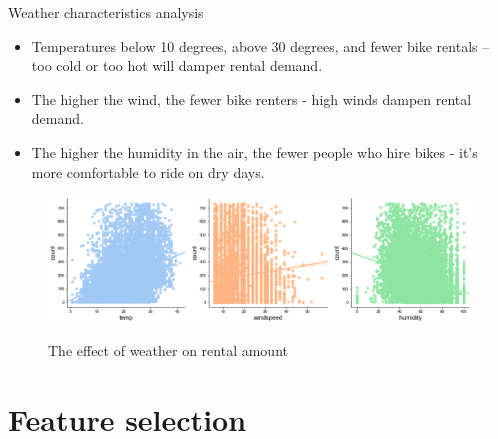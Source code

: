 \documentclass[
 size=14pt,
 paper=smartboard,  %
 mode=present, 		%
 display=slides, 	%
 style=tuliplab,  	%
 pauseslide,
 fleqn,leqno]{powerdot}
\begin{document}
\begin{slide}{Weather characteristics analysis}
  \begin{itemize}
    \item
    Temperatures below 10 degrees, above 30 degrees, and fewer bike rentals -- too cold or too hot will damper rental demand. 
    \item
    The higher the wind, the fewer bike renters - high winds dampen rental demand.
    \item
    The higher the humidity in the air, the fewer people who hire bikes - it's more comfortable to ride on dry days.
    \end{itemize}
  \vspace{-1.5cm}
  \begin{figure}
    \centering
    \includegraphics[width=1\textwidth]{figures//weather.eps}\\
    \caption{The effect of weather on rental amount} \label{framework}
  \end{figure}
      
      
  \end{slide}
\section{Feature selection}
\end{document}
